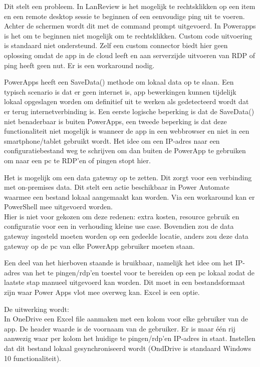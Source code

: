 Dit stelt een probleem. In LanReview is het mogelijk te rechtsklikken op een item en een remote desktop sessie te beginnen of een eenvoudige ping uit te voeren. Achter de schermen wordt dit met de command prompt uitgevoerd. In Powerapps is het om te beginnen niet mogelijk om te rechtsklikken. Custom code uitvoering is standaard niet ondersteund. Zelf een custom connector biedt hier geen oplossing omdat de app in de cloud leeft en aan serverzijde uitvoeren van RDP of ping heeft geen nut. Er is een workaround nodig.

PowerApps heeft een SaveData() methode om lokaal data op te slaan. Een typisch scenario is dat er geen internet is, app bewerkingen kunnen tijdelijk lokaal opgeslagen worden om definitief uit te werken als gedetecteerd wordt dat er terug internetverbinding is. Een eerste logische beperking is dat de SaveData() niet benaderbaar is buiten PowerApps, een tweede beperking is dat deze functionaliteit niet mogelijk is wanneer de app in een webbrowser en niet in een smartphone/tablet gebruikt wordt. Het idee om een IP-adres naar een configuratiebestand weg te schrijven om dan buiten de PowerApp te gebruiken om naar een pc te RDP'en of pingen stopt hier.

Het is mogelijk om een data gateway op te zetten. Dit zorgt voor een verbinding met on-premises data. Dit stelt een actie beschikbaar in Power Automate waarmee een bestand lokaal aangemaakt kan worden. Via een workaround kan er PowerShell mee uitgevoerd worden. \autocite{Luca2017}\\
Hier is niet voor gekozen om deze redenen: extra kosten, resource gebruik en configuratie voor een in verhouding kleine use case. Bovendien zou de data gateway ingesteld moeten worden op een gedeelde locatie, anders zou deze data gateway op de pc van elke PowerApp gebruiker moeten staan.

Een deel van het hierboven staande is bruikbaar, namelijk het idee om het IP-adres van het te pingen/rdp'en toestel voor te bereiden op een pc lokaal zodat de laatste stap manueel uitgevoerd kan worden. Dit moet in een bestandsformaat zijn waar Power Apps vlot mee overweg kan. Excel is een optie.

De uitwerking wordt:\\
In OneDrive een Excel file aanmaken met een kolom voor elke gebruiker van de app. De header waarde is  de voornaam van de gebruiker. Er is maar één rij aanwezig waar per kolom het huidige te pingen/rdp'en IP-adres in staat. Instellen dat dit bestand lokaal gesynchroniseerd wordt (OndDrive is standaard Windows 10 functionaliteit).

